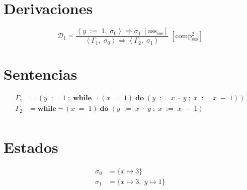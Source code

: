 \documentclass[a4paper]{article}
\begin{document}
\section*{Derivaciones}
\[ \mathcal{D}_{1} = \frac{\left\langle \mathit{y}\;\mathrel{:=}\;1,\; \sigma_{0}\right\rangle \Rightarrow \sigma_{1}\;\mathrm{[ass_{sos}]}}{\left\langle \Gamma_{1},\; \sigma_{0}\right\rangle \Rightarrow \left\langle \Gamma_{2},\; \sigma_{1}\right\rangle}\;\mathrm{[comp^2_{sos}]} \]

\section*{Sentencias}
\begin{align*}
\Gamma_{1} &= (\mathit{y}\;\mathrel{:=}\;1\;;\;\mathbf{while}\;\neg\;(\mathit{x}\;=\;1)\;\mathbf{do}\;(\mathit{y}\;\mathrel{:=}\;\mathit{x}\;\cdot\;\mathit{y}\;;\;\mathit{x}\;\mathrel{:=}\;\mathit{x}\;-\;1)) \\
\Gamma_{2} &= \mathbf{while}\;\neg\;(\mathit{x}\;=\;1)\;\mathbf{do}\;(\mathit{y}\;\mathrel{:=}\;\mathit{x}\;\cdot\;\mathit{y}\;;\;\mathit{x}\;\mathrel{:=}\;\mathit{x}\;-\;1) \\
\end{align*}

\section*{Estados}
\begin{align*}
\sigma_{0} &= \{\mathit{x} \mapsto 3\} \\
\sigma_{1} &= \{\mathit{x} \mapsto 3,\; \mathit{y} \mapsto 1\} \\
\end{align*}
\end{document}
